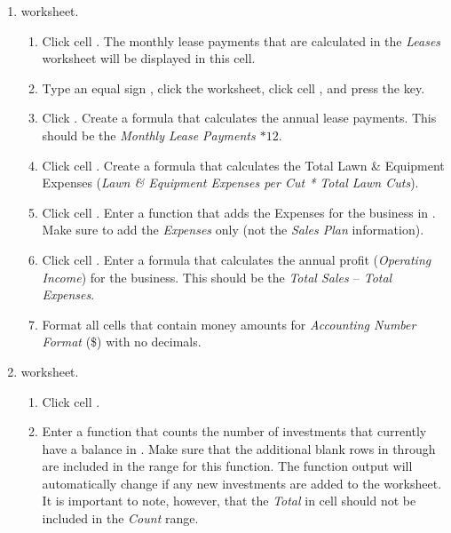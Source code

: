 \begin{enumerate}
\begin{enumerate}
	\end{enumerate}

	\item {} worksheet.
	
	\begin{enumerate}
		\item Click cell . The monthly lease payments that are calculated in the \textit{Leases} worksheet will be displayed in this cell.
		
		\item Type an equal sign \fmtTyping{=}, click the  worksheet, click cell , and press the  key.
		
		\item Click . Create a formula that calculates the annual lease payments. This should be the \textit{Monthly Lease Payments $ * 12 $}.
		
		\item Click cell . Create a formula that calculates the Total Lawn \& Equipment Expenses (\textit{Lawn \& Equipment Expenses per Cut * Total Lawn Cuts}).
		
		\item Click cell . Enter a  function that adds the Expenses for the business in . Make sure to add the \textit{Expenses} only (not the \textit{Sales Plan} information).
		
		\item Click cell . Enter a formula that calculates the annual profit (\textit{Operating Income}) for the business. This should be the \textit{Total Sales $ – $ Total Expenses}.
		
		\item Format all cells that contain money amounts for \textit{Accounting Number Format} (\$) with no decimals.
	\end{enumerate}

	\item {} worksheet.
	
	\begin{enumerate}
		\item Click cell . 
		
		\item Enter a  function that counts the number of investments that currently have a balance in . Make sure that the additional blank rows in  through  are included in the range for this function. The function output will automatically change if any new investments are added to the worksheet. It is important to note, however, that the \textit{Total} in cell  should not be included in the \textit{Count} range.
		

\end{enumerate}
\end{enumerate}

